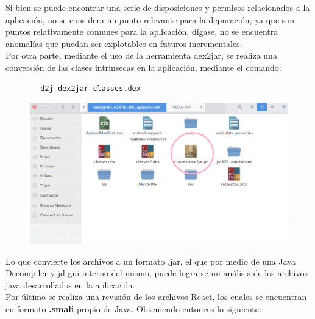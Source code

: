 \documentclass[a4paper,11pt]{article}
\theoremstyle{mytheor}
\begin{document}
\begin{itemize}
    Si bien se puede encontrar una serie de disposiciones y permisos relacionados a la aplicación, no se considera un punto relevante para la depuración, ya que son puntos relativamente comunes para la aplicación, dígase, no se encuentra anomalías que puedan ser explotables en futuros incrementales.\\
    
    Por otra parte, mediante el uso de la herramienta dex2jar, se realiza una conversión de las clases intrinsecas en la aplicación, mediante el comando:
    
    \begin{verbatim}
        d2j-dex2jar classes.dex
    \end{verbatim}
    
        
     \begin{figure}[!h]
    \centering
    \includegraphics[scale=0.5]{jarclases.png}
    \label{fig:my_label}
    \end{figure}
    
    
    Lo que convierte los archivos a un formato .jar, el que por medio de una Java Decompiler y jd-gui interno del mismo, puede lograrse un análisis de los archivos java desarrollados en la aplicación.\\
    
    Por último se realiza una revisión de los archivos React, los cuales se encuentran en formato \textbf{.smali} propio de Java. Obteniendo entonces lo siguiente:
    

\end{itemize}
\end{document}

